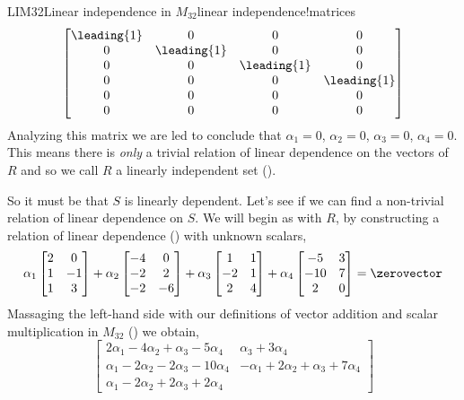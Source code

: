 \begin{example}{LIM32}{Linear independence in $M_{32}$}{linear independence!matrices}
\begin{equation*}
\begin{bmatrix}
\leading{1} & 0 & 0 & 0\\
0 & \leading{1} & 0 & 0\\
0 & 0 & \leading{1} & 0\\
0 & 0 & 0 & \leading{1}\\
0 & 0 & 0 & 0\\
0 & 0 & 0 & 0
\end{bmatrix}
\end{equation*}
%
Analyzing this matrix we are led to conclude that $\alpha_1=0$, $\alpha_2=0$, $\alpha_3=0$, $\alpha_4=0$.  This means there is {\em only} a trivial relation of linear dependence on the vectors of $R$ and so we call $R$ a linearly independent set ().\par
%
So it must be that $S$ is linearly dependent.  Let's see if we can find a non-trivial relation of linear dependence on $S$.  We will begin as with $R$, by constructing a relation of linear dependence () with unknown scalars,
%
\begin{equation*}
\alpha_1\begin{bmatrix}
2 & 0\\ 1 & -1\\ 1 & 3
\end{bmatrix}+
\alpha_2\begin{bmatrix}
-4 & 0\\ -2 & 2\\ -2 & -6
\end{bmatrix}+
\alpha_3\begin{bmatrix}
1 & 1\\ -2 & 1\\ 2 & 4
\end{bmatrix}+
\alpha_4\begin{bmatrix}
-5 & 3\\ -10 & 7\\ 2 & 0
\end{bmatrix}=
\zerovector
\end{equation*}
%
Massaging the left-hand side with our definitions of vector addition and scalar multiplication in $M_{32}$ () we obtain,
%
\begin{equation*}
\begin{bmatrix}
2\alpha_1-4\alpha_2+\alpha_3-5\alpha_4&
                              \alpha_3+3\alpha_4\\
\alpha_1-2\alpha_2-2\alpha_3-10\alpha_4&
-\alpha_1+2\alpha_2+\alpha_3+7\alpha_4\\
\alpha_1-2\alpha_2+2\alpha_3+2\alpha_4&

\end{bmatrix}
\end{equation*}
\end{example}
